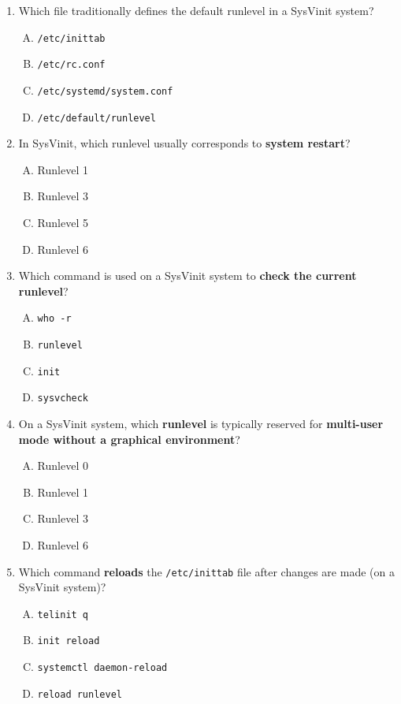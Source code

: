 \documentclass[12pt,a4paper]{report}
\begin{document}
\begin{enumerate}[1.]

    \item Which file traditionally defines the default runlevel in a SysVinit system?
    \begin{enumerate}[A)]
        \item \texttt{/etc/inittab}
        \item \texttt{/etc/rc.conf}
        \item \texttt{/etc/systemd/system.conf}
        \item \texttt{/etc/default/runlevel}
    \end{enumerate}
    
    \item In SysVinit, which runlevel usually corresponds to \textbf{system restart}?
    \begin{enumerate}[A)]
        \item Runlevel 1
        \item Runlevel 3
        \item Runlevel 5
        \item Runlevel 6
    \end{enumerate}
    
    \item Which command is used on a SysVinit system to \textbf{check the current runlevel}?
    \begin{enumerate}[A)]
        \item \texttt{who -r}
        \item \texttt{runlevel}
        \item \texttt{init}
        \item \texttt{sysvcheck}
    \end{enumerate}
    
    \item On a SysVinit system, which \textbf{runlevel} is typically reserved for \textbf{multi-user mode without a graphical environment}?
    \begin{enumerate}[A)]
        \item Runlevel 0
        \item Runlevel 1
        \item Runlevel 3
        \item Runlevel 6
    \end{enumerate}
    
    \item Which command \textbf{reloads} the \texttt{/etc/inittab} file after changes are made (on a SysVinit system)?
    \begin{enumerate}[A)]
        \item \texttt{telinit q}
        \item \texttt{init reload}
        \item \texttt{systemctl daemon-reload}
        \item \texttt{reload runlevel}
    \end{enumerate}
    

\end{enumerate}
\end{document}
